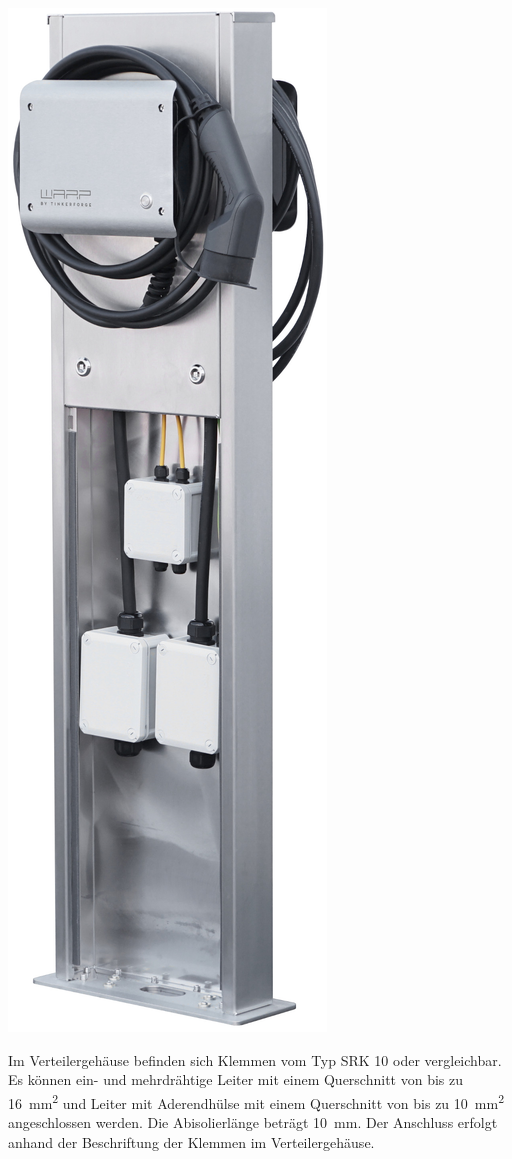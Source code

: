 \documentclass[a4paper,10pt]{article}
\begin{document}
\begin{multicols*}{2}
	\begin{center}
		\includegraphics[width=0.5\linewidth]{./img/warp-charger-stand-back-opened}
	\end{center}

	Im Verteilergehäuse befinden sich Klemmen vom Typ SRK 10
	oder vergleichbar. Es können ein- und mehrdrähtige Leiter mit einem Querschnitt von bis zu
	\SI{16}{\square\milli\meter} und Leiter mit Aderendhülse mit einem
	Querschnitt von bis zu \SI{10}{\square\milli\meter} angeschlossen werden.
	Die Abisolierlänge beträgt \SI{10}{\milli\meter}. Der Anschluss erfolgt
	anhand der Beschriftung der Klemmen im Verteilergehäuse.


\end{multicols*}
\end{document}

